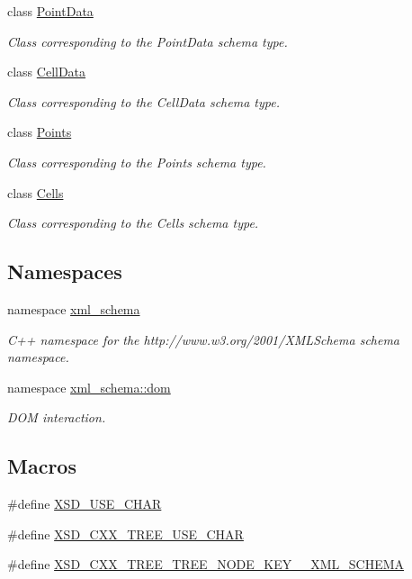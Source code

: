 \begin{DoxyCompactItemize}
class \hyperlink{classPointData}{Point\-Data}
\begin{DoxyCompactList}\small\item\em Class corresponding to the Point\-Data schema type. \end{DoxyCompactList}\item 
class \hyperlink{classCellData}{Cell\-Data}
\begin{DoxyCompactList}\small\item\em Class corresponding to the Cell\-Data schema type. \end{DoxyCompactList}\item 
class \hyperlink{classPoints}{Points}
\begin{DoxyCompactList}\small\item\em Class corresponding to the Points schema type. \end{DoxyCompactList}\item 
class \hyperlink{classCells}{Cells}
\begin{DoxyCompactList}\small\item\em Class corresponding to the Cells schema type. \end{DoxyCompactList}\end{DoxyCompactItemize}
\subsection*{Namespaces}
\begin{DoxyCompactItemize}
\item 
namespace \hyperlink{namespacexml__schema}{xml\-\_\-schema}
\begin{DoxyCompactList}\small\item\em C++ namespace for the http\-://www.w3.\-org/2001/\-X\-M\-L\-Schema schema namespace. \end{DoxyCompactList}\item 
namespace \hyperlink{namespacexml__schema_1_1dom}{xml\-\_\-schema\-::dom}
\begin{DoxyCompactList}\small\item\em D\-O\-M interaction. \end{DoxyCompactList}\end{DoxyCompactItemize}
\subsection*{Macros}
\begin{DoxyCompactItemize}
\item 
\#define \hyperlink{vtk-unstructured_8h_aee0a950eb1ff2461391d858c0cd254b7}{X\-S\-D\-\_\-\-U\-S\-E\-\_\-\-C\-H\-A\-R}
\item 
\#define \hyperlink{vtk-unstructured_8h_acef724a52414642ad3c9b7209702daf5}{X\-S\-D\-\_\-\-C\-X\-X\-\_\-\-T\-R\-E\-E\-\_\-\-U\-S\-E\-\_\-\-C\-H\-A\-R}
\item 
\#define \hyperlink{vtk-unstructured_8h_ab727c6f10de580ac0bb8f7395fa68895}{X\-S\-D\-\_\-\-C\-X\-X\-\_\-\-T\-R\-E\-E\-\_\-\-T\-R\-E\-E\-\_\-\-N\-O\-D\-E\-\_\-\-K\-E\-Y\-\_\-\-\_\-\-X\-M\-L\-\_\-\-S\-C\-H\-E\-M\-A}
\end{DoxyCompactItemize}
